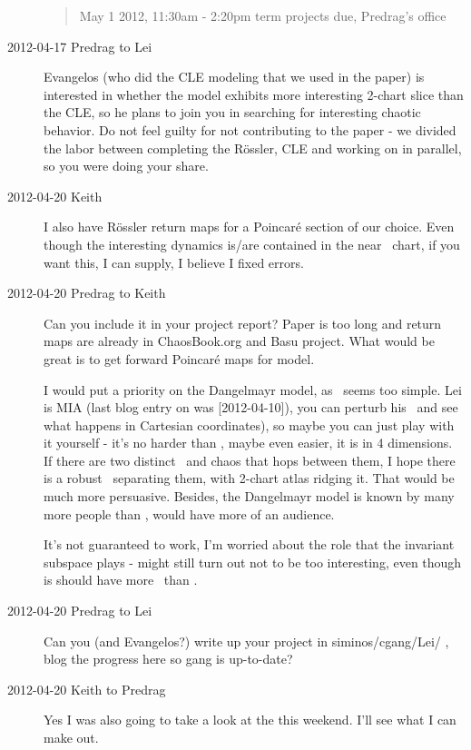 \begin{description}
\begin{quote}
{\color{red} \large
May 1 2012,  11:30am - 2:20pm term projects due, Predrag's office
}
\end{quote}


\item[2012-04-17 Predrag to Lei] Evangelos (who did the CLE modeling that
we used in the paper) is interested in whether the {\twoMode} model exhibits
more interesting 2-chart slice than the CLE, so he plans to join you in
searching for interesting chaotic behavior. Do not feel guilty for not
contributing to the paper - we divided the labor between completing the
R\"ossler, CLE and working on {\twoMode} in parallel, so you were doing your
share.


\item[2012-04-20 Keith] I also have R\"ossler return maps for a
Poincar\'e section of our choice.  Even though the interesting dynamics
is/are contained in the near \eqv\ chart, if you want this, I can
supply, I believe I fixed errors.

\item[2012-04-20 Predrag to Keith] Can you include it in your project report?
Paper is too long and return maps are already in ChaosBook.org and Basu project.
What would be great is to get forward Poincar\'e maps for {\twoMode} model.

I would put a priority on the Dangelmayr {\twoMode} model, as \cLe\ seems too
simple. Lei is MIA (last blog entry on {\twoMode} was [2012-04-10]), you can
perturb his \reqva\ and see what happens in Cartesian coordinates), so
maybe you can just play with it yourself - it's no harder than \cLe,
maybe even easier, it is in 4 dimensions. If there are two distinct
\reqva\ and chaos that hops between them, I hope there is a robust
\chartBord\ separating them, with 2-chart atlas ridging it. That would be
much more persuasive. Besides, the Dangelmayr {\twoMode} model is known by
many more people than \cLe, would have more of an audience.

It's not guaranteed to work, I'm worried about the role that the
invariant subspace plays - might still turn out not to be too
interesting, even though is should have more \reqva\ than \cLe.


\item[2012-04-20 Predrag to Lei] Can you (and Evangelos?) write up {\twoMode}
your project in siminos/cgang/Lei/ , blog the progress here so gang is
up-to-date?

\item[2012-04-20 Keith to Predrag]  Yes I was also going to take a look
at the {\twoMode} this weekend.  I'll see what I can make out.


\end{description}
